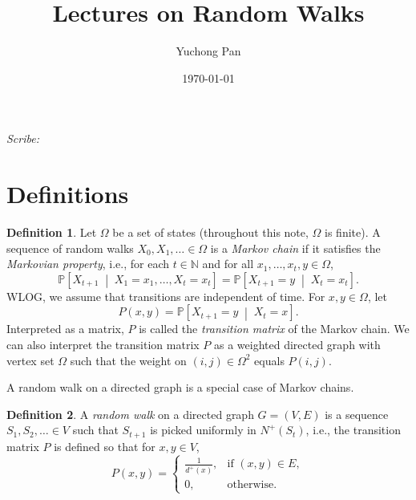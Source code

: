 \documentclass[letterpaper, reqno,11pt]{article}
\newcommand{\NN}{\mathbb{N}}
\newcommand{\PP}{\mathbb{P}}
\begin{document}
\title{Lectures on Random Walks}
\author{Yuchong Pan}
\date{\today}
\newtheorem{theorem}{Theorem}
\newtheorem{lemma}[theorem]{Lemma}
\newtheorem{proposition}[theorem]{Proposition}
\newtheorem{corollary}[theorem]{Corollary}
\newtheorem{fact}[theorem]{Fact}
\newtheorem{problem}[theorem]{Problem}
\newtheorem{claim}{Claim}
\newtheorem{exercise}{Exercise}
\theoremstyle{definition}
\newtheorem{definition}[theorem]{Definition}
%

\begin{framed}
 \hfill \thedate
\begin{center}
\Large{\thetitle}
\end{center}
 \hfill {\em Scribe: \theauthor}
\end{framed}

\section{Definitions}

\begin{definition}
  Let $\Omega$ be a set of states (throughout this note, $\Omega$ is finite). A sequence of random walks $X_0, X_1, \ldots \in \Omega$ is a \emph{Markov chain} if it satisfies the \emph{Markovian property}, i.e., for each $t \in \NN$ and for all $x_1, \ldots, x_t, y \in \Omega$,
  $$ \PP\left[X_{t + 1} \;\middle|\; X_1 = x_1, \ldots, X_t = x_t\right] = \PP\left[X_{t + 1} = y \;\middle|\; X_t = x_t\right]. $$
  WLOG, we assume that transitions are independent of time. For $x, y \in \Omega$, let
  $$ P(x, y) = \PP\left[X_{t + 1} = y \;\middle|\; X_t = x\right]. $$
  Interpreted as a matrix, $P$ is called the \emph{transition matrix} of the Markov chain. We can also interpret the transition matrix $P$ as a weighted directed graph with vertex set $\Omega$ such that the weight on $(i, j) \in \Omega^2$ equals $P(i, j)$.
\end{definition}

A random walk on a directed graph is a special case of Markov chains.

\begin{definition}
  A \emph{random walk} on a directed graph $G = (V, E)$ is a sequence $S_1, S_2, \ldots \in V$ such that $S_{t + 1}$ is picked uniformly in $N^+(S_t)$, i.e., the transition matrix $P$ is defined so that for $x, y \in V$,
  $$ P(x, y) = \left\{
    \begin{array}{ll}
      \frac{1}{d^+(x)}, & \text{if $(x, y) \in E$}, \\
      0, & \text{otherwise}.
    \end{array}
  \right. $$
\end{definition}
\end{document}
